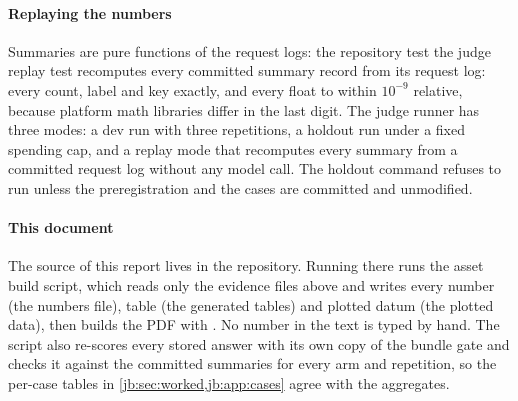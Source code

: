 \paragraph{Replaying the numbers} Summaries are pure functions of the request logs: the repository test
the judge replay test recomputes every committed summary record from its request log: every count, label and
key exactly, and every float to within $10^{-9}$ relative, because platform math libraries differ in the
last digit. The judge runner has three modes: a dev run with three repetitions, a holdout run under a fixed spending cap, and a replay mode that recomputes every summary from a committed request log without any model call.
The holdout command refuses to run unless the preregistration and the cases are committed and unmodified.

\paragraph{This document} The source of this report lives in
the repository. Running  there runs
the asset build script, which reads only the evidence files above and writes every number
(the numbers file), table (the generated tables) and plotted datum
(the plotted data), then builds the PDF with . No number in the text is typed by hand.
The script also re-scores every stored answer with its own copy of the bundle gate and checks it against
the committed summaries for every arm and repetition, so the per-case tables in
\cref{jb:sec:worked,jb:app:cases} agree with the aggregates.
